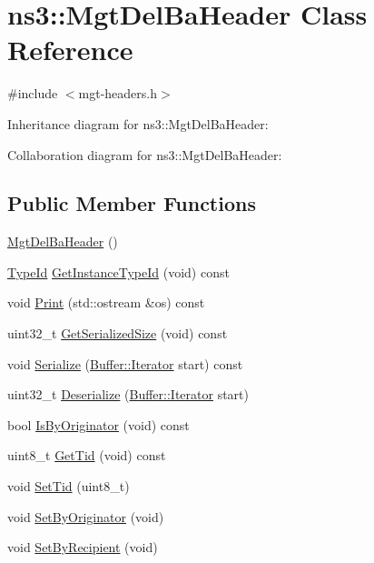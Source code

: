 \hypertarget{classns3_1_1MgtDelBaHeader}{}\section{ns3\+:\+:Mgt\+Del\+Ba\+Header Class Reference}
\label{classns3_1_1MgtDelBaHeader}


{\ttfamily \#include $<$mgt-\/headers.\+h$>$}



Inheritance diagram for ns3\+:\+:Mgt\+Del\+Ba\+Header\+:


Collaboration diagram for ns3\+:\+:Mgt\+Del\+Ba\+Header\+:
\subsection*{Public Member Functions}
\begin{DoxyCompactItemize}
\item 
\hyperlink{classns3_1_1MgtDelBaHeader_a8be309e746dded6507bd7ceabfbcac34}{Mgt\+Del\+Ba\+Header} ()
\item 
\hyperlink{classns3_1_1TypeId}{Type\+Id} \hyperlink{classns3_1_1MgtDelBaHeader_a7b61f48f2cde3ea8cbbdbb6fcb3e0608}{Get\+Instance\+Type\+Id} (void) const 
\item 
void \hyperlink{classns3_1_1MgtDelBaHeader_a0249b70efcd27a731f9702bf02a4ca07}{Print} (std\+::ostream \&os) const 
\item 
uint32\+\_\+t \hyperlink{classns3_1_1MgtDelBaHeader_a0632cb4ea7c9d05e2332fa0e647642df}{Get\+Serialized\+Size} (void) const 
\item 
void \hyperlink{classns3_1_1MgtDelBaHeader_a4686f89157445f923e3aab5849eb90ca}{Serialize} (\hyperlink{classns3_1_1Buffer_1_1Iterator}{Buffer\+::\+Iterator} start) const 
\item 
uint32\+\_\+t \hyperlink{classns3_1_1MgtDelBaHeader_a69d8934b2ba8529288d0f8797c16e0fb}{Deserialize} (\hyperlink{classns3_1_1Buffer_1_1Iterator}{Buffer\+::\+Iterator} start)
\item 
bool \hyperlink{classns3_1_1MgtDelBaHeader_a4b915851bba8240ae71d4e0b7c797811}{Is\+By\+Originator} (void) const 
\item 
uint8\+\_\+t \hyperlink{classns3_1_1MgtDelBaHeader_a67177f3adf061ae7c2cd2cdd9f1cb9ce}{Get\+Tid} (void) const 
\item 
void \hyperlink{classns3_1_1MgtDelBaHeader_a34d5c6c4fcb0b4e9128e8add115d1179}{Set\+Tid} (uint8\+\_\+t)
\item 
void \hyperlink{classns3_1_1MgtDelBaHeader_a57adafa240048133ccf436c521f8d04d}{Set\+By\+Originator} (void)
\item 
void \hyperlink{classns3_1_1MgtDelBaHeader_aa8135aee62ccc1cab7c9a6e881fa7c41}{Set\+By\+Recipient} (void)
\end{DoxyCompactItemize}
